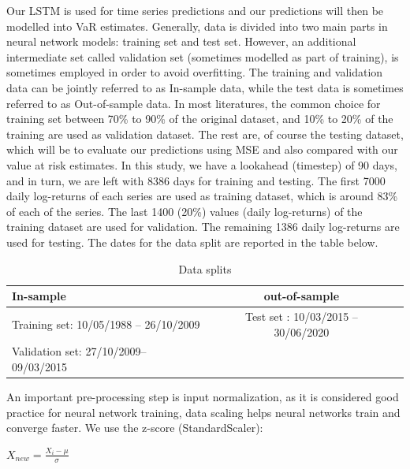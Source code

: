 \documentclass[a4paper,11pt,oneside]{book}
\begin{document}
Our LSTM is used for time series predictions and our predictions will then be modelled into VaR estimates. Generally, data is divided into two main parts in neural network models: training set and test set. However, an additional intermediate set called validation set (sometimes modelled as part of training), is sometimes employed in order to avoid overfitting. The training and validation data can be jointly referred to as In-sample data, while the test data is sometimes referred to as Out-of-sample data. In most literatures, the common choice for training set between 70\% to 90\% of the original dataset, and 10\% to 20\% of the training are used as validation dataset. The rest are, of course the testing dataset, which will be to evaluate our predictions using MSE and also compared with our value at risk estimates. \newline\newline
In this study, we have a lookahead (timestep) of 90 days, and in turn, we are left with 8386 days for training and testing. The first 7000 daily log-returns of each series are used as training dataset, which is around 83\% of each of the series. The last 1400 (20\%) values (daily log-returns) of the training dataset are used for validation. The remaining 1386 daily log-returns are used for testing. The dates for the data split are reported in the table below.
\newline\newline
\begin{table}[!h]
	\centering
	\begin{tabular}{l|cl}
		\hline \hline
		In-sample
		& out-of-sample\\ \hline
		Training set: 10/05/1988 – 26/10/2009
		& Test set
		: 10/03/2015 – 30/06/2020
	 \\
		Validation set: 27/10/2009– 09/03/2015
		\\
		\hline \hline
	\end{tabular}
	\caption{Data splits}
	\label{firsttab}
\end{table}

An important pre-processing step is input normalization, as it is considered good practice for neural network training, data scaling helps neural networks train and converge faster. We use the z-score (StandardScaler): 

\begin{center}
	$X_{new} = \frac{X_{i}-\mu}{\sigma}$
\end{center}
\end{document}
